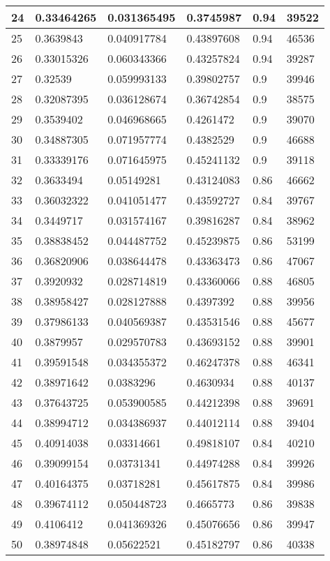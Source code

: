 \begin{longtable}{|l|l|l|l|l|l|}
24 & 0.33464265 & 0.031365495 & 0.3745987 & 0.94 & 39522 \\ \hline 
25 & 0.3639843 & 0.040917784 & 0.43897608 & 0.94 & 46536 \\ \hline 
26 & 0.33015326 & 0.060343366 & 0.43257824 & 0.94 & 39287 \\ \hline 
27 & 0.32539 & 0.059993133 & 0.39802757 & 0.9 & 39946 \\ \hline 
28 & 0.32087395 & 0.036128674 & 0.36742854 & 0.9 & 38575 \\ \hline 
29 & 0.3539402 & 0.046968665 & 0.4261472 & 0.9 & 39070 \\ \hline 
30 & 0.34887305 & 0.071957774 & 0.4382529 & 0.9 & 46688 \\ \hline 
31 & 0.33339176 & 0.071645975 & 0.45241132 & 0.9 & 39118 \\ \hline 
32 & 0.3633494 & 0.05149281 & 0.43124083 & 0.86 & 46662 \\ \hline 
33 & 0.36032322 & 0.041051477 & 0.43592727 & 0.84 & 39767 \\ \hline 
34 & 0.3449717 & 0.031574167 & 0.39816287 & 0.84 & 38962 \\ \hline 
35 & 0.38838452 & 0.044487752 & 0.45239875 & 0.86 & 53199 \\ \hline 
36 & 0.36820906 & 0.038644478 & 0.43363473 & 0.86 & 47067 \\ \hline 
37 & 0.3920932 & 0.028714819 & 0.43360066 & 0.88 & 46805 \\ \hline 
38 & 0.38958427 & 0.028127888 & 0.4397392 & 0.88 & 39956 \\ \hline 
39 & 0.37986133 & 0.040569387 & 0.43531546 & 0.88 & 45677 \\ \hline 
40 & 0.3879957 & 0.029570783 & 0.43693152 & 0.88 & 39901 \\ \hline 
41 & 0.39591548 & 0.034355372 & 0.46247378 & 0.88 & 46341 \\ \hline 
42 & 0.38971642 & 0.0383296 & 0.4630934 & 0.88 & 40137 \\ \hline 
43 & 0.37643725 & 0.053900585 & 0.44212398 & 0.88 & 39691 \\ \hline 
44 & 0.38994712 & 0.034386937 & 0.44012114 & 0.88 & 39404 \\ \hline 
45 & 0.40914038 & 0.03314661 & 0.49818107 & 0.84 & 40210 \\ \hline 
46 & 0.39099154 & 0.03731341 & 0.44974288 & 0.84 & 39926 \\ \hline 
47 & 0.40164375 & 0.03718281 & 0.45617875 & 0.84 & 39986 \\ \hline 
48 & 0.39674112 & 0.050448723 & 0.4665773 & 0.86 & 39838 \\ \hline 
49 & 0.4106412 & 0.041369326 & 0.45076656 & 0.86 & 39947 \\ \hline 
50 & 0.38974848 & 0.05622521 & 0.45182797 & 0.86 & 40338 \\ \hline 
\end{longtable}